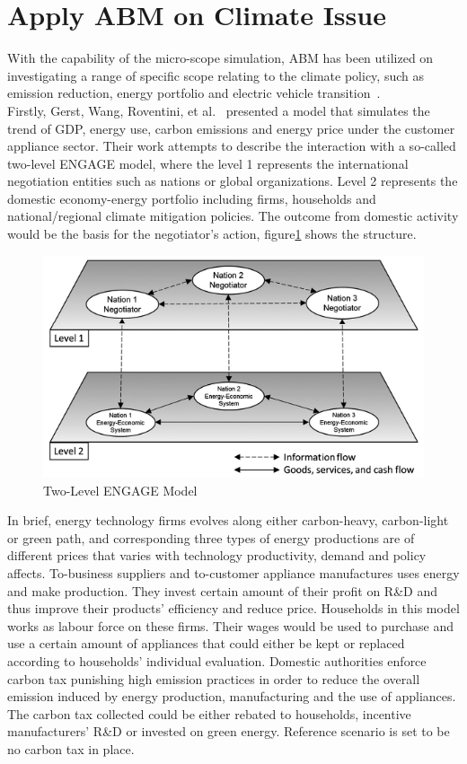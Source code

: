 \documentclass[12pt,twoside]{report}
\begin{document}
	
	\section{Apply ABM on Climate Issue}\label{sec:climate-impact-on-economic-metrics}
	With the capability of the micro-scope simulation, ABM has been utilized on investigating a
	range of
	specific
	scope relating to the climate policy, such as emission reduction, energy portfolio and electric vehicle
	transition~\cite{Castro2020, MUELLER20091072}.\\
	
	Firstly, Gerst, Wang, Roventini, et al.~\cite{GERST201362} presented a model that simulates the trend of GDP,
	energy use, carbon emissions and energy price under the customer appliance sector.
	Their work attempts to describe the interaction with a so-called two-level ENGAGE model, where the level 1
	represents the international negotiation entities such as nations or global organizations.
	Level 2 represents the domestic economy-energy portfolio including firms, households and national/regional climate
	mitigation policies.
	The outcome from domestic activity would be the basis for the negotiator's action, figure\ref{fig:ENGAGE} shows the
	structure.
	\begin{figure}[htb]
		\centering
		\includegraphics[width = 0.6\linewidth]{./figures/ENGAGE}
		\caption{Two-Level ENGAGE Model\cite{GERST201362}}
		\label{fig:ENGAGE}
	\end{figure}
	
	In brief, energy technology firms evolves along either carbon-heavy, carbon-light or green path, and
	corresponding three types of energy productions are of different prices that varies with technology productivity,
	demand and policy affects.
	To-business suppliers and to-customer appliance manufactures uses energy and make production.
	They invest certain amount of their profit on R\&D and thus improve their products' efficiency and reduce price.
	Households in this model works as labour force on these firms.
	Their wages would be used to purchase and use a certain amount of appliances that could either be kept or replaced
	according to households' individual evaluation.
	Domestic authorities enforce carbon tax punishing high emission practices in order to reduce the overall emission
	induced by energy production, manufacturing and the use of appliances.
	The carbon tax collected could be either rebated to households, incentive manufacturers' R\&D or invested on
	green energy.
	Reference scenario is set to be no carbon tax in place.
	\\
	
\end{document}

